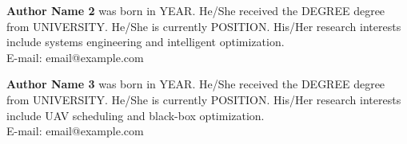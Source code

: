 \documentclass[twocolumn]{article}
\begin{document}
\vspace{0.1in}
\noindent\textbf{Author Name 2} was born in YEAR. He/She received the DEGREE degree from UNIVERSITY. He/She is currently POSITION. His/Her research interests include systems engineering and intelligent optimization.\\
E-mail: email@example.com

\vspace{0.1in}
\noindent\textbf{Author Name 3} was born in YEAR. He/She received the DEGREE degree from UNIVERSITY. He/She is currently POSITION. His/Her research interests include UAV scheduling and black-box optimization.\\
E-mail: email@example.com

\balance
\end{document}
